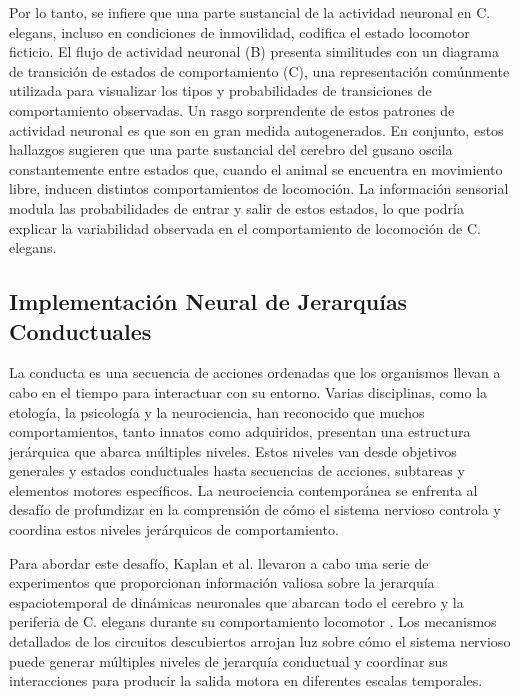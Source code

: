 Por lo tanto, se infiere que una parte sustancial de la actividad neuronal en C. elegans, incluso en condiciones de inmovilidad, codifica el estado locomotor ficticio. El flujo de actividad neuronal (B) presenta similitudes con un diagrama de transición de estados de comportamiento  (C), una representación comúnmente utilizada para visualizar los tipos y probabilidades de transiciones de comportamiento observadas. Un rasgo sorprendente de estos patrones de actividad neuronal es que son en gran medida autogenerados. En conjunto, estos hallazgos sugieren que una parte sustancial del cerebro del gusano oscila constantemente entre estados que, cuando el animal se encuentra en movimiento libre, inducen distintos comportamientos de locomoción. La información sensorial modula las probabilidades de entrar y salir de estos estados, lo que podría explicar la variabilidad observada en el comportamiento de locomoción de C. elegans.




\subsection{Implementación Neural de Jerarquías Conductuales}\label{sec:kaplan}


La conducta es una secuencia de acciones ordenadas que los organismos llevan a cabo en el tiempo para interactuar con su entorno. Varias disciplinas, como la etología, la psicología y la neurociencia, han reconocido que muchos comportamientos, tanto innatos como adquiridos, presentan una estructura jerárquica que abarca múltiples niveles. Estos niveles van desde objetivos generales y estados conductuales hasta secuencias de acciones, subtareas y elementos motores específicos. La neurociencia contemporánea se enfrenta al desafío de profundizar en la comprensión de cómo el sistema nervioso controla y coordina estos niveles jerárquicos de comportamiento.

Para abordar este desafío, Kaplan et al. \cite{kaplan_nested_2020} llevaron a cabo una serie de experimentos que proporcionan información valiosa sobre la jerarquía espaciotemporal de dinámicas neuronales que abarcan todo el cerebro y la periferia de C. elegans durante su comportamiento locomotor  \cite{hollon_neural_2020}. Los mecanismos detallados de los circuitos descubiertos arrojan luz sobre cómo el sistema nervioso puede generar múltiples niveles de jerarquía conductual y coordinar sus interacciones para producir la salida motora en diferentes escalas temporales.


